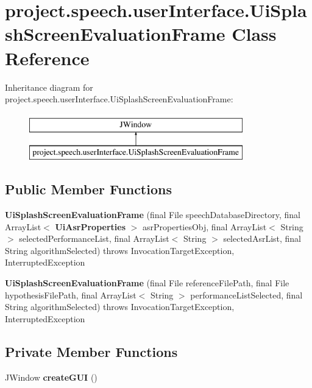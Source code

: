 \section{project.\+speech.\+user\+Interface.\+Ui\+Splash\+Screen\+Evaluation\+Frame Class Reference}
\label{classproject_1_1speech_1_1user_interface_1_1_ui_splash_screen_evaluation_frame}
Inheritance diagram for project.\+speech.\+user\+Interface.\+Ui\+Splash\+Screen\+Evaluation\+Frame\+:\begin{figure}[H]
\begin{center}
\leavevmode
\includegraphics[height=2.000000cm]{classproject_1_1speech_1_1user_interface_1_1_ui_splash_screen_evaluation_frame}
\end{center}
\end{figure}
\subsection*{Public Member Functions}
\begin{DoxyCompactItemize}
\item 
{\bf Ui\+Splash\+Screen\+Evaluation\+Frame} (final File speech\+Database\+Directory, final Array\+List$<$ {\bf Ui\+Asr\+Properties} $>$ asr\+Properties\+Obj, final Array\+List$<$ String $>$ selected\+Performance\+List, final Array\+List$<$ String $>$ selected\+Asr\+List, final String algorithm\+Selected)  throws Invocation\+Target\+Exception, Interrupted\+Exception  
\item 
{\bf Ui\+Splash\+Screen\+Evaluation\+Frame} (final File reference\+File\+Path, final File hypothesis\+File\+Path, final Array\+List$<$ String $>$ performance\+List\+Selected, final String algorithm\+Selected)  throws Invocation\+Target\+Exception, Interrupted\+Exception  
\end{DoxyCompactItemize}
\subsection*{Private Member Functions}
\begin{DoxyCompactItemize}
\item 
J\+Window {\bf create\+G\+U\+I} ()
\end{DoxyCompactItemize}


